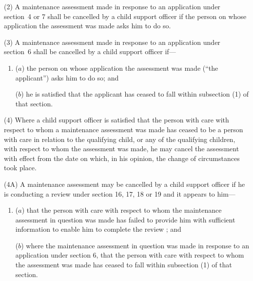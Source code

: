 \documentclass[12pt,a4paper]{article}
\begin{document}
(2) A maintenance assessment made in response to an application under section~4 or 7 shall be cancelled by 
a child support officer 
if the person on whose application the assessment was made asks him to do so.

(3) A maintenance assessment made in response to an application under section~6 shall be cancelled by 
a child support officer 
if—
\begin{enumerate}\item[]
($a$) the person on whose application the assessment was made (“the applicant”) asks him to do so; and

($b$) he is satisfied that the applicant has ceased to fall within subsection (1)  of that section.
\end{enumerate}

(4) Where 
a child support officer 
is satisfied that the person with care with respect to whom a maintenance assessment was made has ceased to be a person with care in relation to the qualifying child, or any of the qualifying children, with respect to whom the assessment was made, he may cancel the assessment with effect from the date on which, in his opinion, the change of circumstances took place.

(4A) A maintenance assessment may be cancelled by 
a child support officer 
if he is 
conducting a review under section 16, 17, 18 or 19 
and it appears to him—
\begin{enumerate}\item[]
($a$) that the person with care with respect to whom the maintenance assessment in question was made has failed to provide him with sufficient information to enable him to 
complete the review%
; and

($b$) where the maintenance assessment in question was made in response to an application under section 6, that the person with care with respect to whom the assessment was made has ceased to fall within subsection (1) of that section.
\end{enumerate}
\end{document}
